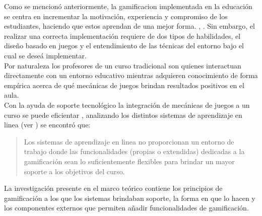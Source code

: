 Como se mencionó anteriormente, la \gls{gamificacion} implementada en la educación se centra
 en incrementar la motivación, experiencia y compromiso de los estudiantes, haciendo que estos
 aprendan de una mejor forma. \cite{GamInE-Learning}, \cite{Lee}.
 \noindent Sin embargo, el realizar una correcta implementación requiere de dos tipos de habilidades, el
 diseño basado en juegos y el entendimiento de las técnicas del entorno bajo el cual se deseá
 implementar. \cite[p. 7]{ForTheWin}\\

 \noindent Por naturaleza los profesores de un curso tradicional son quienes interactuan
 directamente con un entorno educativo mientras adquieren conocimiento de forma empírica
 acerca de qué mecánicas de juegos brindan resultados positivos en el aula.\\

 \noindent Con la ayuda de soporte tecnológico la integración de mecánicas de juegos a un
 curso se puede eficientar \cite{Wood-Reiners}, analizando los distintos sistemas de aprendizaje en linea
 (ver ) se encontró que:

    \begin{quote}
    \colorbox{blue!05}{\parbox{\dimexpr\linewidth-2\fboxsep}{\strut%
        Los sistemas de aprendizaje en linea no proporcionan un entorno
        de trabajo donde las funcionalidades (propias o extendidas) dedicadas
        a la gamificación sean lo suficientemente flexibles para brindar un
        mayor soporte a los objetivos del curso.
    \strut}}%
    \end{quote}

 \hfill \par
 \noindent La investigación presente en el marco teórico contiene los principios de gamificación
 a los que los sistemas brindaban soporte, la forma en que lo hacen y los componentes externos que
 permiten añadir funcionalidades de gamificación.



